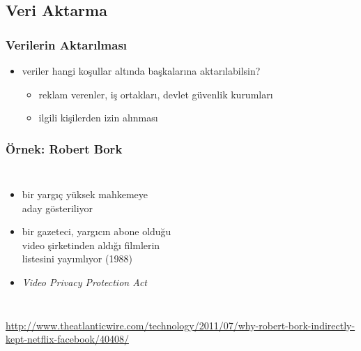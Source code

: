 \documentclass[dvipsnames]{beamer}
\theoremstyle{definition}
\theoremstyle{example}
\theoremstyle{plain}
\begin{document}
\subsection{Veri Aktarma}

\begin{frame}
  \frametitle{Verilerin Aktarılması}

  \begin{itemize}
    \item veriler hangi koşullar altında başkalarına aktarılabilsin?
    \begin{itemize}
      \item reklam verenler, iş ortakları, devlet güvenlik kurumları
      \item ilgili kişilerden izin alınması
    \end{itemize}
  \end{itemize}
\end{frame}

\begin{frame}
  \frametitle{Örnek: Robert Bork}

  \begin{columns}

    \begin{itemize}
      \item bir yargıç yüksek mahkemeye\\
        aday gösteriliyor
      \item bir gazeteci, yargıcın abone olduğu\\
        video şirketinden aldığı filmlerin\\
        listesini yayımlıyor (1988)

      \medskip
      \item \emph{Video Privacy Protection Act}
    \end{itemize}
  \end{columns}

  \medskip
  \tiny{\url{http://www.theatlanticwire.com/technology/2011/07/why-robert-bork-indirectly-kept-netflix-facebook/40408/}}\\
\end{frame}
\end{document}
